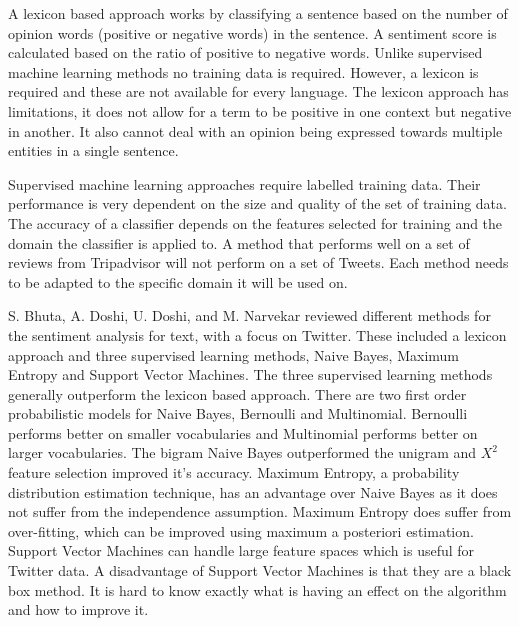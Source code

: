 A lexicon based approach works by classifying a sentence based on the number of opinion words (positive or negative words) in the sentence. A sentiment score is calculated based on the ratio of positive to negative words. Unlike supervised machine learning methods no training data is required. However, a lexicon is required and these are not available for every language. The lexicon approach has limitations, it does not allow for a term to be positive in one context but negative in another. It also cannot deal with an opinion being expressed towards multiple entities in a single sentence.

Supervised machine learning approaches require labelled training data. Their performance is very dependent on the size and quality of the set of training data. The accuracy of a classifier depends on the features selected for training and the domain the classifier is applied to. A method that performs well on a set of reviews from Tripadvisor will not perform on a set of Tweets. Each method needs to be adapted to the specific domain it will be used on.

S. Bhuta, A. Doshi, U. Doshi, and M. Narvekar \cite{Bhuta2014} reviewed different methods for the sentiment analysis for text, with a focus on Twitter. These included a lexicon approach and three supervised learning methods, Naive Bayes, Maximum Entropy and Support Vector Machines. The three supervised learning methods generally outperform the lexicon based approach. There are two first order probabilistic models for Naive Bayes, Bernoulli and Multinomial. Bernoulli performs better on smaller vocabularies and Multinomial performs better on larger vocabularies. The bigram Naive Bayes outperformed the unigram and ${X}^2$ feature selection improved it's accuracy. Maximum Entropy, a probability distribution estimation technique, has an advantage over Naive Bayes as it does not suffer from the independence assumption. Maximum Entropy does suffer from over-fitting, which can be improved using maximum a posteriori estimation. Support Vector Machines can handle large feature spaces which is useful for Twitter data. A disadvantage of Support Vector Machines is that they are a black box method. It is hard to know exactly what is having an effect on the algorithm and how to improve it.

